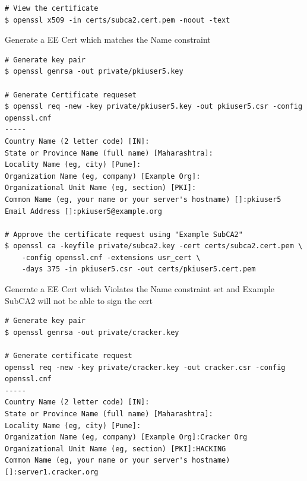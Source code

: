 \documentclass[a4paper]{article}
\begin{document}
\begin{enumerate}[label*=\arabic*.]
\begin{lstlisting}[style=bashInputStyle]
# View the certificate
$ openssl x509 -in certs/subca2.cert.pem -noout -text
            \end{lstlisting}
            Generate a EE Cert which matches the Name constraint 
            \begin{lstlisting}[style=bashInputStyle]
# Generate key pair
$ openssl genrsa -out private/pkiuser5.key

# Generate Certificate requeset
$ openssl req -new -key private/pkiuser5.key -out pkiuser5.csr -config openssl.cnf
-----
Country Name (2 letter code) [IN]:
State or Province Name (full name) [Maharashtra]:
Locality Name (eg, city) [Pune]:
Organization Name (eg, company) [Example Org]:
Organizational Unit Name (eg, section) [PKI]:
Common Name (eg, your name or your server's hostname) []:pkiuser5
Email Address []:pkiuser5@example.org

# Approve the certificate request using "Example SubCA2"
$ openssl ca -keyfile private/subca2.key -cert certs/subca2.cert.pem \ 
    -config openssl.cnf -extensions usr_cert \
    -days 375 -in pkiuser5.csr -out certs/pkiuser5.cert.pem    
            \end{lstlisting}
            Generate a EE Cert which Violates the Name constraint set and Example SubCA2
            will not be able to sign the cert
            \begin{lstlisting}[style=bashInputStyle]
# Generate key pair
$ openssl genrsa -out private/cracker.key

# Generate certificate request
openssl req -new -key private/cracker.key -out cracker.csr -config openssl.cnf
-----
Country Name (2 letter code) [IN]:
State or Province Name (full name) [Maharashtra]:
Locality Name (eg, city) [Pune]:
Organization Name (eg, company) [Example Org]:Cracker Org
Organizational Unit Name (eg, section) [PKI]:HACKING
Common Name (eg, your name or your server's hostname) []:server1.cracker.org


\end{lstlisting}
\end{enumerate}
\end{document}
